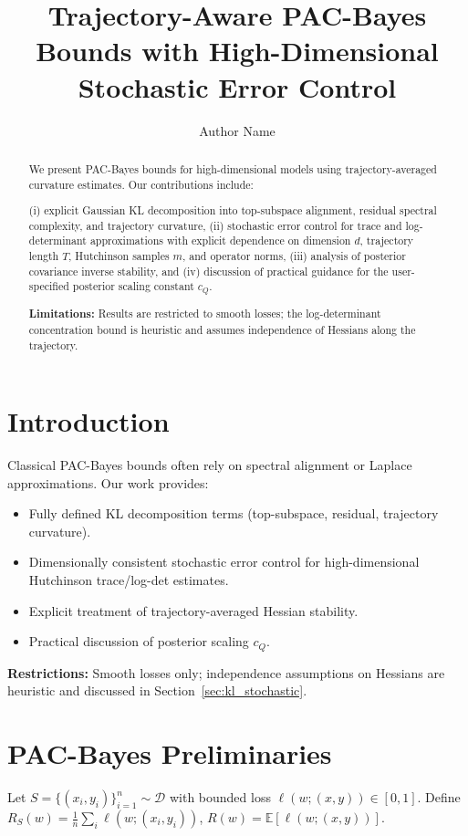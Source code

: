 \documentclass[11pt]{article}
\title{Trajectory-Aware PAC-Bayes Bounds with High-Dimensional Stochastic Error Control}
\author{Author Name}
\begin{document}
\maketitle

\begin{abstract}
We present PAC-Bayes bounds for high-dimensional models using trajectory-averaged curvature estimates.  
Our contributions include:

(i) explicit Gaussian KL decomposition into top-subspace alignment, residual spectral complexity, and trajectory curvature,  
(ii) stochastic error control for trace and log-determinant approximations with explicit dependence on dimension $d$, trajectory length $T$, Hutchinson samples $m$, and operator norms,  
(iii) analysis of posterior covariance inverse stability, and  
(iv) discussion of practical guidance for the user-specified posterior scaling constant $c_Q$.  

\textbf{Limitations:} Results are restricted to smooth losses; the log-determinant concentration bound is heuristic and assumes independence of Hessians along the trajectory.
\end{abstract}

\section{Introduction}
Classical PAC-Bayes bounds often rely on spectral alignment or Laplace approximations.  
Our work provides:

\begin{itemize}[noitemsep]
    \item Fully defined KL decomposition terms (top-subspace, residual, trajectory curvature).
    \item Dimensionally consistent stochastic error control for high-dimensional Hutchinson trace/log-det estimates.
    \item Explicit treatment of trajectory-averaged Hessian stability.
    \item Practical discussion of posterior scaling $c_Q$.
\end{itemize}

\textbf{Restrictions:} Smooth losses only; independence assumptions on Hessians are heuristic and discussed in Section~\ref{sec:kl_stochastic}.

\section{PAC-Bayes Preliminaries}
Let $S = \{(x_i,y_i)\}_{i=1}^n \sim \mathcal{D}$ with bounded loss $\ell(w;(x,y)) \in [0,1]$.  
Define $R_S(w) = \frac{1}{n}\sum_i \ell(w;(x_i,y_i))$, $R(w) = \mathbb{E}[\ell(w;(x,y))]$.
\end{document}
